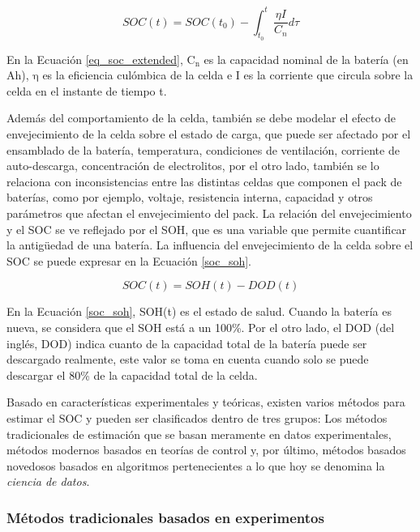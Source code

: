 \documentclass[10pt,a4paper]{article}
\begin{document}
\begin{equation}
    SOC(t) = SOC(t_0) - \int_{t_0}^t \frac{\eta I}{C_n }d\tau
    \label{eq_soc_extended}
\end{equation}

\noindent En la Ecuaci\'on \ref{eq_soc_extended}, $\mathrm{C_n}$ es la 
capacidad nominal de la bater\'ia (en Ah), $\mathrm{\eta}$ es la eficiencia 
cul\'ombica de la celda e I es la corriente que circula sobre la celda en el 
instante de tiempo t.

\noindent Adem\'as del comportamiento de la celda, tambi\'en se debe modelar el
efecto de envejecimiento de la celda sobre el estado de carga, que puede ser
afectado por el ensamblado de la bater\'ia, temperatura, condiciones de
ventilaci\'on, corriente de auto-descarga, concentraci\'on de electrolitos, por
el otro lado, tambi\'en se lo relaciona con inconsistencias entre las distintas
celdas que componen el pack de bater\'ias, como por ejemplo, voltaje,
resistencia interna, capacidad y otros par\'ametros que afectan el 
envejecimiento del pack. La relaci\'on del envejecimiento y el \acrshort{SOC} se
ve reflejado por el \acrshort{SOH}, que es una variable que permite cuantificar
la antigüedad de una bater\'ia. La influencia del envejecimiento de la celda
sobre el \acrshort{SOC} se puede expresar en la Ecuaci\'on \ref{soc_soh}.

\begin{equation}
    SOC(t) = SOH(t) - DOD(t) \label{soc_soh}
\end{equation}

\noindent En la Ecuaci\'on \ref{soc_soh}, SOH(t) es el estado de salud. 
Cuando la bater\'ia es nueva, se considera que el SOH est\'a a un 100\%. 
Por el otro lado, el \acrshort{DOD} (del ingl\'es, \acrlong{DOD}) indica cuanto 
de la capacidad total de la bater\'ia puede ser descargado realmente, este valor 
se toma en cuenta cuando solo se puede descargar el 80\% de la capacidad total 
de la celda.

\noindent Basado en caracter\'isticas experimentales y te\'oricas, existen 
varios m\'etodos para estimar el \acrshort{SOC} y pueden ser clasificados dentro 
de tres grupos: Los m\'etodos tradicionales de estimaci\'on que se basan 
meramente en datos experimentales, m\'etodos modernos basados en teor\'ias de 
control y, por \'ultimo, m\'etodos basados novedosos basados en algoritmos
pertenecientes a lo que hoy se denomina la \emph{ciencia de datos}.

\subsubsection{M\'etodos tradicionales basados en experimentos}
\label{tradSocMeth}
\end{document}
